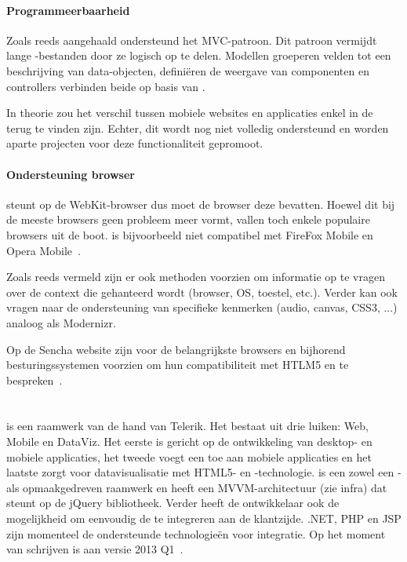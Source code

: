 \paragraph{Programmeerbaarheid}
\label{sec:sencha-programeerbaarheid}
Zoals reeds aangehaald ondersteund \st{} het MVC-patroon.  
Dit patroon vermijdt lange \js{}-bestanden door ze logisch op te delen.  
Modellen groeperen velden tot een beschrijving van data-objecten,  definiëren de weergave van componenten en controllers verbinden beide op basis van .

In theorie zou het verschil tussen mobiele websites en applicaties enkel in de  terug te vinden zijn.  
Echter,  dit wordt nog niet volledig ondersteund en worden aparte projecten voor deze functionaliteit gepromoot.

\paragraph{Ondersteuning browser}
\st{} steunt op de WebKit-browser  dus moet de browser deze bevatten.  
Hoewel dit bij de meeste browsers geen probleem meer vormt, vallen toch enkele populaire browsers uit de boot.  
\st{} is bijvoorbeeld niet compatibel met FireFox Mobile en Opera Mobile~\cite{JohnEClark2012}.

Zoals reeds vermeld zijn er ook methoden voorzien om informatie op te vragen over de context die gehanteerd wordt (browser, OS, toestel, etc.).  
Verder kan \st{} ook vragen naar de ondersteuning van specifieke kenmerken (audio,  canvas,  CSS3, ...)  analoog als Modernizr.  

Op de Sencha website zijn voor de belangrijkste browsers en bijhorend besturingssystemen  voorzien om hun compatibiliteit met HTLM5 en \st{} te bespreken~\cite{Inc.}.


\section{\kendo}
\label{sec:raamwerk-kendo}
\kendo{} is een raamwerk van de hand van Telerik.
Het bestaat uit drie luiken:  Web, Mobile en DataViz.  
Het eerste is gericht op de ontwikkeling van desktop- en mobiele applicaties,  het tweede voegt een  toe aan mobiele applicaties en het laatste zorgt voor datavisualisatie met HTML5- en \js{}-technologie.
\kendo{} is een zowel een \js{}- als opmaakgedreven raamwerk en heeft een MVVM-architectuur (zie infra) dat steunt op de jQuery bibliotheek.
Verder heeft de ontwikkelaar ook de mogelijkheid om eenvoudig de  te integreren aan de klantzijde.
.NET,  PHP en JSP zijn momenteel de ondersteunde technologieën voor  integratie.
Op het moment van schrijven is \kendo{} aan versie 2013 Q1~\cite{Telerik}. 

